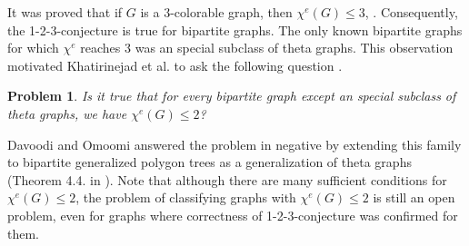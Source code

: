 \documentclass[12pt,a4paper]{article}
\newtheorem{problem}[theorem]{Problem}
\begin{document}
It was proved that if $ G $ is a $ 3$-colorable graph, then $ \chi^{e}(G)\leq 3$, \cite{KLT}. Consequently, the 1-2-3-conjecture is true for bipartite graphs.  The only known bipartite graphs for which $ \chi^{e}$ reaches $3$ was an special subclass of theta graphs.
 This observation motivated  Khatirinejad et al. to  ask the following question \cite{Khatir}.
\begin{problem} \em{\cite{Khatir}}\label{khatir}
	Is it true that for every bipartite graph except an special subclass of theta graphs, we have $ \chi^{e}(G)\leq 2 $?
\end{problem}
Davoodi and Omoomi answered the problem in negative by extending  this family to bipartite generalized polygon trees as a generalization of theta graphs (Theorem 4.4. in \cite{DO}).
Note that although there are many sufficient conditions for $ \chi^{e}(G)\leq 2 $, the problem of classifying graphs with $ \chi^{e}(G)\leq 2 $ is still an open problem, even for graphs where correctness of 1-2-3-conjecture was confirmed for them.
\end{document}
